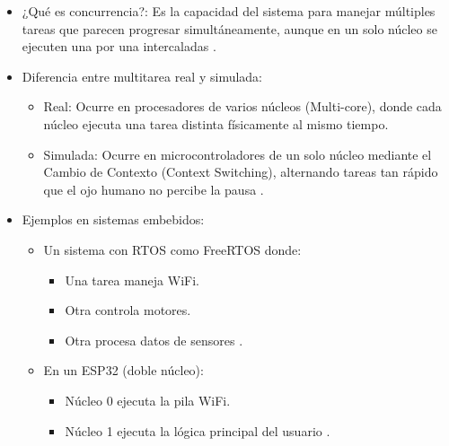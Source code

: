 \begin{itemize}
    \item ¿Qué es concurrencia?: Es la capacidad del sistema para manejar múltiples tareas que parecen progresar simultáneamente, aunque en un solo núcleo se ejecuten una por una intercaladas \cite{sergio_2015_interrupciones} \cite{rivas_2012_multitarea}.
    
    \item Diferencia entre multitarea real y simulada:

       \begin{itemize}

       \item Real: Ocurre en procesadores de varios núcleos (Multi-core), donde cada núcleo ejecuta una tarea distinta físicamente al mismo tiempo.
       
       \item Simulada: Ocurre en microcontroladores de un solo núcleo mediante el Cambio de Contexto (Context Switching), alternando tareas tan rápido que el ojo humano no percibe la pausa \cite{rivas_2012_multitarea} \cite{verdugamonar_2025_controladores}.
         
       \end{itemize}
    
    \item Ejemplos en sistemas embebidos:

        \begin{itemize}

         \item Un sistema con RTOS como FreeRTOS donde:

             \begin{itemize}

             \item Una tarea maneja WiFi.
       
             \item Otra controla motores.

             \item Otra procesa datos de sensores \cite{verdugamonar_2025_controladores}.
         
            \end{itemize}
       
         \item En un ESP32 (doble núcleo):

               \begin{itemize}

               \item Núcleo 0 ejecuta la pila WiFi.
       
               \item Núcleo 1 ejecuta la lógica principal del usuario \cite{rivas_2012_multitarea}.
         
              \end{itemize}
         
        \end{itemize}
  
\end{itemize}

